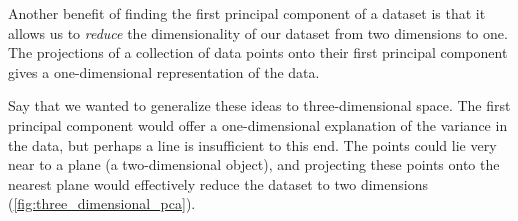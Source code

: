 %

Another benefit of finding the first principal component of a dataset is that it allows us to \textit{reduce} the dimensionality of our dataset from two dimensions to one. The projections of a collection of data points onto their first principal component gives a one-dimensional representation of the data.

Say that we wanted to generalize these ideas to three-dimensional space. The first principal component would offer a one-dimensional explanation of the variance in the data, but perhaps a line is insufficient to this end. The points could lie very near to a plane (a two-dimensional object), and projecting these points onto the nearest plane would effectively reduce the dataset to two dimensions (\autoref{fig:three_dimensional_pca}).\\

